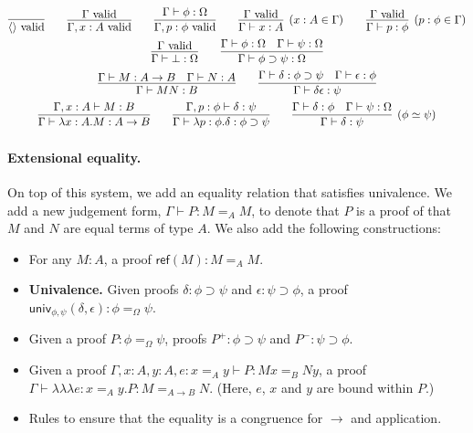 \documentclass{easychair}
\newcommand{\vald}{\ \mathrm{valid}}
\newcommand{\univ}[4]{\mathsf{univ}_{{#1},{#2}} \left( {#3} , {#4} \right)}
\newcommand{\triplelambda}{\lambda \!\! \lambda \!\! \lambda}
\newcommand{\reff}[1]{\mathsf{ref} \left( {#1} \right)}
\begin{document}
\begin{gather*}
\infer{\langle \rangle \vald}{} \qquad
\infer{\Gamma, x : A \vald}{\Gamma \vald} \qquad 
\infer{\Gamma, p : \phi \vald}{\Gamma \vdash \phi : \Omega} \qquad
\infer[(x : A \in \Gamma)]{\Gamma \vdash x : A}{\Gamma \vald} \qquad
\infer[(p : \phi \in \Gamma)]{\Gamma \vdash p : \phi}{\Gamma \vald} \\
\infer{\Gamma \vdash \bot : \Omega}{\Gamma \vald} \qquad
\infer{\Gamma \vdash \phi \supset \psi : \Omega}{\Gamma \vdash \phi : \Omega \quad \Gamma \vdash \psi : \Omega} \\
\infer{\Gamma \vdash M N : B} {\Gamma \vdash M : A \rightarrow B \quad \Gamma \vdash N : A} \qquad
\infer{\Gamma \vdash \delta \epsilon : \psi} {\Gamma \vdash \delta : \phi \supset \psi \quad \Gamma \vdash \epsilon : \phi} \\
\infer{\Gamma \vdash \lambda x:A.M : A \rightarrow B}{\Gamma, x : A \vdash M : B} \qquad
\infer{\Gamma \vdash \lambda p : \phi . \delta : \phi \supset \psi}{\Gamma, p : \phi \vdash \delta : \psi} \qquad
\infer[(\phi \simeq \psi)]{\Gamma \vdash \delta : \psi}{\Gamma \vdash \delta : \phi \quad \Gamma \vdash \psi : \Omega}
\end{gather*}

\paragraph{Extensional equality.}

On top of this system, we add an equality relation that satisfies univalence.  We add a new judgement form,
$\Gamma \vdash P : M =_A M$, to denote that $P$ is a proof of that $M$ and $N$ are equal terms of type $A$.  We also add the following constructions:
\begin{itemize}
\item
For any $M : A$, a proof $\reff{M} : M =_A M$.
\item
\textbf{Univalence.}  Given proofs $\delta : \phi \supset \psi$ and $\epsilon : \psi \supset \phi$, a proof
$\univ{\phi}{\psi}{\delta}{\epsilon} : \phi =_\Omega \psi$.
\item
Given a proof $P : \phi =_\Omega \psi$, proofs $P^+ : \phi \supset \psi$ and $P^- : \psi \supset \phi$.
\item
Given a proof $\Gamma, x : A, y : A, e : x =_A y \vdash P : Mx =_B Ny$, a proof \\ $\Gamma \vdash \triplelambda e : x=_Ay . P : M =_{A \rightarrow B} N$.  (Here, $e$, $x$ and $y$ are bound within $P$.)
\item
Rules to ensure that the equality is a congruence for $\rightarrow$ and application.
\end{itemize}
\end{document}
